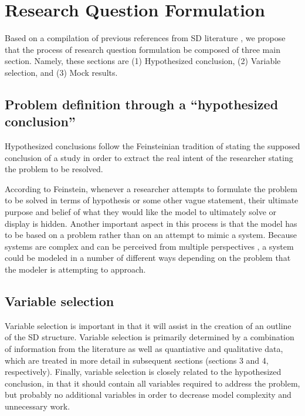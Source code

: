 \documentclass[11pt]{article}
\begin{document}
\section{Research Question Formulation}

Based on a compilation of previous references from SD literature \cite {PenaLyneis2009}, we propose that the process of research question formulation be composed of three main section.  Namely, these sections are (1) Hypothesized conclusion, (2) Variable selection, and (3) Mock results.  

\subsection{Problem definition through a ``hypothesized conclusion''}

Hypothesized conclusions follow the Feinsteinian tradition \cite{Feinstein1987} of stating the supposed conclusion of a study in order to extract the real intent of the researcher stating the problem to be resolved.

According to Feinstein, whenever a researcher attempts to formulate the problem to be solved in terms of hypothesis or some other vague statement, their ultimate purpose and belief of what they would like the model to ultimately solve or display is hidden.  Another important aspect in this process is that the model has to be based on a problem rather than on an attempt to mimic a system.  Because systems are complex and can be perceived from multiple perspectives \cite{GIERE2006}, a system could be modeled in a number of different ways depending on the problem that the modeler is attempting to approach.  

\subsection{Variable selection}

Variable selection is important in that it will assist in the creation of an outline of the SD structure. Variable selection is primarily determined by a combination of information from the literature as well as quantiative and qualitative data, which are treated in more detail in subsequent sections (sections 3 and 4, respectively).  Finally, variable selection is closely related to the hypothesized conclusion, in that it should contain all variables required to address the problem, but probably no additional variables in order to decrease model complexity and unnecessary work.
\end{document}
